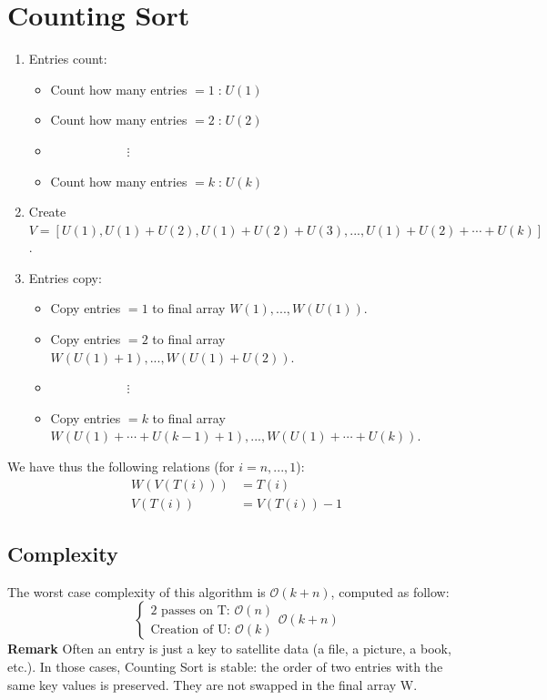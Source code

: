 \section{Counting Sort}
\begin{enumerate}
\item Entries count:
\begin{itemize} 
	\item Count how many entries $=1 \;$:$\; U(1)$
	\item Count how many entries $=2 \;$:$\; U(2)$
	\item $\qquad \qquad \qquad \vdots$
	\item Count how many entries $=k \;$:$\; U(k)$
	\end{itemize}
\item Create $V = \left[ U(1), U(1)+U(2), U(1)+U(2)+U(3), ..., U(1)+U(2)+\cdots+U(k) \right]$.
\item Entries copy:
\begin{itemize} 
	\item Copy entries $=1$ to final array $W(1),...,W(U(1))$.
	\item Copy entries $=2$ to final array $W(U(1)+1),...,W(U(1)+U(2))$.
	\item $\qquad \qquad \qquad \vdots$
	\item Copy entries $=k$ to final array $W(U(1)+\cdots+U(k-1)+1),...,W(U(1)+\cdots+U(k))$.
	\end{itemize}
\end{enumerate}
We have thus the following relations (for $i=n,...,1$):
\begin{align*}
W(V(T(i))) & = T(i) \\
V(T(i)) & = V(T(i)) - 1
\end{align*}

\subsection{Complexity} The worst case complexity of this algorithm is $\mathcal{O}(k+n)$, computed as follow:
\[ 
\begin{cases}
\text{2 passes on T: } \mathcal{O}(n) \\
\text{Creation of U: } \mathcal{O}(k)
\end{cases} \mathcal{O}(k+n)
\]
\textbf{Remark} Often an entry is just a key to satellite data (a file, a picture, a book, etc.). In those cases, Counting Sort is stable: the order of two entries with the same key values is preserved. They are not swapped in the final array W.

